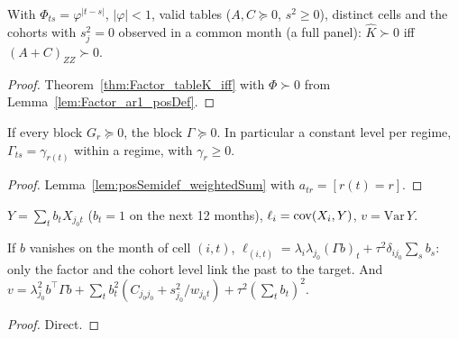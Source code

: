 \begin{corollary}\label{cor:Factor_tableK_ar1_iff}
  \leanok
  With $\Phi_{ts} = \varphi^{|t-s|}$, $|\varphi| < 1$, valid tables ($A, C \succeq 0$, $s^2 \ge 0$),
  distinct cells and the cohorts with $s_j^2 = 0$ observed in a common month (a full panel):
  $\hat K \succ 0$ iff $(A + C)_{ZZ} \succ 0$.
\end{corollary}
\begin{proof}
  \leanok
  Theorem~\ref{thm:Factor_tableK_iff} with $\Phi \succ 0$ from
  Lemma~\ref{lem:Factor_ar1_posDef}.
\end{proof}

\begin{theorem}\label{thm:Factor_block}
  \leanok
  If every block $G_r \succeq 0$, the block $\Gamma \succeq 0$. In particular a constant level
  per regime, $\Gamma_{ts} = \gamma_{r(t)}$ within a regime, with $\gamma_r \ge 0$.
\end{theorem}
\begin{proof}
  \leanok
  Lemma~\ref{lem:posSemidef_weightedSum} with $a_{tr} = [r(t) = r]$.
\end{proof}

\begin{definition}\label{def:Factor_target}
  \leanok
  $Y = \sum_t b_tX_{j_0t}$ ($b_t = 1$ on the next 12 months),
  $\ell_i = \operatorname{cov}(X_i, Y)$, $v = \mathrm{Var}\,Y$.
\end{definition}

\begin{lemma}\label{lem:Factor_target}
  \leanok
  If $b$ vanishes on the month of cell $(i,t)$,
  $\ell_{(i,t)} = \lambda_i\lambda_{j_0}(\Gamma b)_t + \tau^2\delta_{ij_0}\sum_s b_s$: only the
  factor and the cohort level link the past to the target. And
  $v = \lambda_{j_0}^2 b^\top\Gamma b + \sum_t b_t^2(C_{j_0j_0} + s_{j_0}^2/w_{j_0t})
    + \tau^2(\sum_t b_t)^2$.
\end{lemma}
\begin{proof}
  \leanok
  Direct.
\end{proof}


